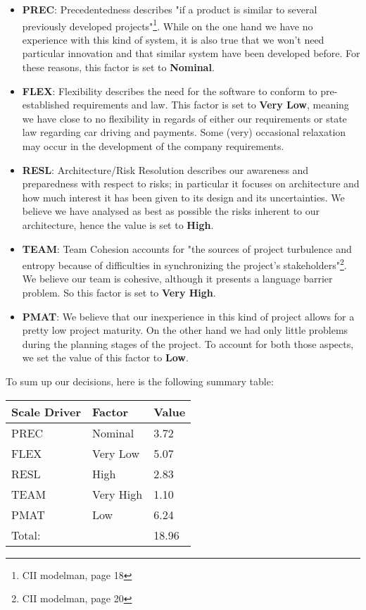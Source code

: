 \begin{itemize}
	\item \textbf{PREC}: Precedentedness describes "if a product is similar to several previously developed projects"\footnote{CII modelman, page 18}. While on the one hand we have no experience with this kind of system, it is also true that we won't need particular innovation and that similar system have been developed before. For these reasons, this factor is set to \textbf{Nominal}.
	\item \textbf{FLEX}: Flexibility describes the need for the software to conform to pre-established requirements and law. This factor is set to \textbf{Very Low}, meaning we have close to no flexibility in regards of either our requirements or state law regarding car driving and payments. Some (very) occasional relaxation may occur in the development of the company requirements. 
	\item \textbf{RESL}: Architecture/Risk Resolution describes our awareness and preparedness with respect to risks; in particular it focuses on architecture and how much interest it has been given to its design and its uncertainties. We believe we have analysed as best as possible the risks inherent to our architecture, hence the value is set to \textbf{High}.
	\item \textbf{TEAM}: Team Cohesion accounts for "the sources of project turbulence and entropy because of difficulties in synchronizing the project’s stakeholders"\footnote{CII modelman, page 20}. We believe our team is cohesive, although it presents a language barrier problem. So this factor is set to \textbf{Very High}.
	\item \textbf{PMAT}: We believe that our inexperience in this kind of project allows for a pretty low project maturity. On the other hand we had only little problems during the planning stages of the project. To account for both those aspects, we set the value of this factor to \textbf{Low}. 
\end{itemize}


To sum up our decisions, here is the following summary table:\\

\begin{center}
	\begin{tabular}{|l|l|l|}
		\hline
		\textbf{Scale Driver} & \textbf{Factor} & \textbf{Value}\\ \hline
		
		PREC & Nominal & 3.72\\
		FLEX & Very Low & 5.07\\
		RESL & High & 2.83\\
		TEAM & Very High & 1.10\\
		PMAT & Low & 6.24\\ \hline
		\multicolumn{2}{|l|}{Total:} & 18.96\\ \hline
	\end{tabular}
\end{center}